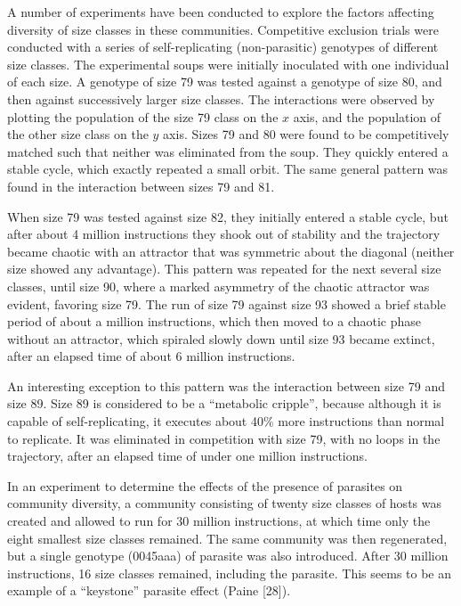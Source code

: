 A number of experiments have been conducted to explore the factors affecting
diversity of size classes in these communities.  Competitive exclusion trials
were conducted with a series of self-replicating (non-parasitic) genotypes
of different size classes.  The experimental soups were initially inoculated
with one individual of each size.  A genotype of size 79 was tested against a
genotype of size 80, and then against successively larger size classes.  The
interactions were observed by plotting the population of the size 79 class
on the $x$ axis, and the population of the other size class on the $y$ axis.
Sizes 79 and 80 were found to be competitively matched such that neither was
eliminated from the soup.  They quickly entered a stable cycle, which exactly
repeated a small orbit.  The same general pattern was found in the interaction
between sizes 79 and 81.

When size 79 was tested against size 82, they initially entered a stable
cycle, but after about 4 million instructions they shook out of stability
and the trajectory became chaotic with an attractor that was symmetric about
the diagonal (neither size showed any advantage).  This pattern was repeated
for the next several size classes, until size 90, where a marked asymmetry of
the chaotic attractor was evident, favoring size 79.  The run of size 79
against size 93 showed a brief stable period of about a million instructions,
which then moved to a chaotic phase without an attractor, which spiraled
slowly down until size 93 became extinct, after an elapsed time of about 6
million instructions.

An interesting exception to this pattern was the interaction between size 79
and size 89.  Size 89 is considered to be a ``metabolic cripple'', because
although it is capable of self-replicating, it executes about 40\% more
instructions than normal to replicate.  It was eliminated in competition
with size 79, with no loops in the trajectory, after an elapsed time of
under one million instructions.

In an experiment to determine the effects of the presence of parasites on
community diversity, a community consisting of twenty size classes of hosts
was created and allowed to run for 30 million instructions, at which time only
the eight smallest size classes remained.  The same community was then
regenerated, but a single genotype (0045aaa) of parasite was also introduced.
After 30 million instructions, 16 size classes remained, including the
parasite.  This seems to be an example of a ``keystone'' parasite effect
(Paine [28]).

